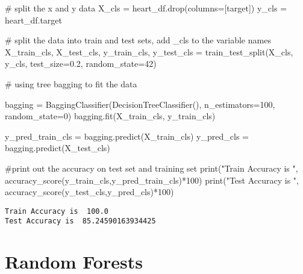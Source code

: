 \documentclass[
  letterpaper,
  DIV=11,
  numbers=noendperiod]{scrreprt}
\newenvironment{Shaded}{\begin{snugshade}}{\end{snugshade}}
\newcommand{\BuiltInTok}[1]{\textcolor[rgb]{0.00,0.23,0.31}{#1}}
\newcommand{\CommentTok}[1]{\textcolor[rgb]{0.37,0.37,0.37}{#1}}
\newcommand{\DecValTok}[1]{\textcolor[rgb]{0.68,0.00,0.00}{#1}}
\newcommand{\FloatTok}[1]{\textcolor[rgb]{0.68,0.00,0.00}{#1}}
\newcommand{\NormalTok}[1]{\textcolor[rgb]{0.00,0.23,0.31}{#1}}
\newcommand{\OperatorTok}[1]{\textcolor[rgb]{0.37,0.37,0.37}{#1}}
\newcommand{\StringTok}[1]{\textcolor[rgb]{0.13,0.47,0.30}{#1}}
\begin{document}
\begin{Shaded}
\begin{Highlighting}[]
\CommentTok{\# split the x and y data}
\NormalTok{X\_cls }\OperatorTok{=}\NormalTok{ heart\_df.drop(columns}\OperatorTok{=}\NormalTok{[}\StringTok{\textquotesingle{}target\textquotesingle{}}\NormalTok{])}
\NormalTok{y\_cls }\OperatorTok{=}\NormalTok{ heart\_df.target}

\CommentTok{\# split the data into train and test sets, add \_cls to the variable names}
\NormalTok{X\_train\_cls, X\_test\_cls, y\_train\_cls, y\_test\_cls }\OperatorTok{=}\NormalTok{ train\_test\_split(X\_cls, y\_cls, test\_size}\OperatorTok{=}\FloatTok{0.2}\NormalTok{, random\_state}\OperatorTok{=}\DecValTok{42}\NormalTok{)}
\end{Highlighting}
\end{Shaded}

\begin{Shaded}
\begin{Highlighting}[]
\CommentTok{\# using tree bagging to fit the data}

\NormalTok{bagging }\OperatorTok{=}\NormalTok{ BaggingClassifier(DecisionTreeClassifier(), n\_estimators}\OperatorTok{=}\DecValTok{100}\NormalTok{, random\_state}\OperatorTok{=}\DecValTok{0}\NormalTok{)}
\NormalTok{bagging.fit(X\_train\_cls, y\_train\_cls)}

\NormalTok{y\_pred\_train\_cls }\OperatorTok{=}\NormalTok{ bagging.predict(X\_train\_cls)}
\NormalTok{y\_pred\_cls }\OperatorTok{=}\NormalTok{ bagging.predict(X\_test\_cls)}


\CommentTok{\#print out the accuracy on test set and training set}
\BuiltInTok{print}\NormalTok{(}\StringTok{"Train Accuracy is "}\NormalTok{, accuracy\_score(y\_train\_cls,y\_pred\_train\_cls)}\OperatorTok{*}\DecValTok{100}\NormalTok{)}
\BuiltInTok{print}\NormalTok{(}\StringTok{"Test Accuracy is "}\NormalTok{, accuracy\_score(y\_test\_cls,y\_pred\_cls)}\OperatorTok{*}\DecValTok{100}\NormalTok{)}
\end{Highlighting}
\end{Shaded}

\begin{verbatim}
Train Accuracy is  100.0
Test Accuracy is  85.24590163934425
\end{verbatim}

\chapter{Random Forests}\label{random-forests}
\end{document}
